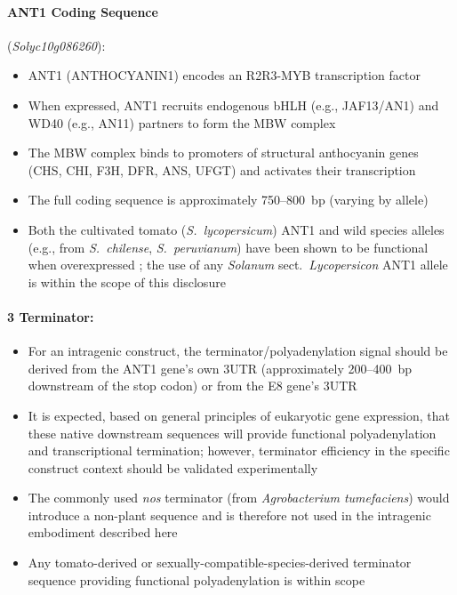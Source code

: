 \documentclass[12pt,a4paper]{article}
\begin{document}
\paragraph{ANT1 Coding Sequence} (\textit{Solyc10g086260}):
\begin{itemize}
  \item ANT1 (ANTHOCYANIN1) encodes an R2R3-MYB transcription factor \citep{Mathews2003}
  \item When expressed, ANT1 recruits endogenous bHLH (e.g., JAF13/AN1) and WD40 (e.g., AN11) partners to form the MBW complex
  \item The MBW complex binds to promoters of structural anthocyanin genes (CHS, CHI, F3H, DFR, ANS, UFGT) and activates their transcription
  \item The full coding sequence is approximately 750--800~bp (varying by allele)
  \item Both the cultivated tomato (\textit{S.~lycopersicum}) ANT1 and wild species alleles (e.g., from \textit{S.~chilense}, \textit{S.~peruvianum}) have been shown to be functional when overexpressed \citep{Mathews2003, Sapir2008}; the use of any \textit{Solanum} sect.\ \textit{Lycopersicon} ANT1 allele is within the scope of this disclosure
\end{itemize}

\paragraph{3\textquotesingle{} Terminator:}
\begin{itemize}
  \item For an intragenic construct, the terminator/polyadenylation signal should be derived from the ANT1 gene's own 3\textquotesingle{}UTR (approximately 200--400~bp downstream of the stop codon) or from the E8 gene's 3\textquotesingle{}UTR
  \item It is expected, based on general principles of eukaryotic gene expression, that these native downstream sequences will provide functional polyadenylation and transcriptional termination; however, terminator efficiency in the specific construct context should be validated experimentally
  \item The commonly used \textit{nos} terminator (from \textit{Agrobacterium tumefaciens}) would introduce a non-plant sequence and is therefore not used in the intragenic embodiment described here
  \item Any tomato-derived or sexually-compatible-species-derived terminator sequence providing functional polyadenylation is within scope
\end{itemize}
\end{document}
